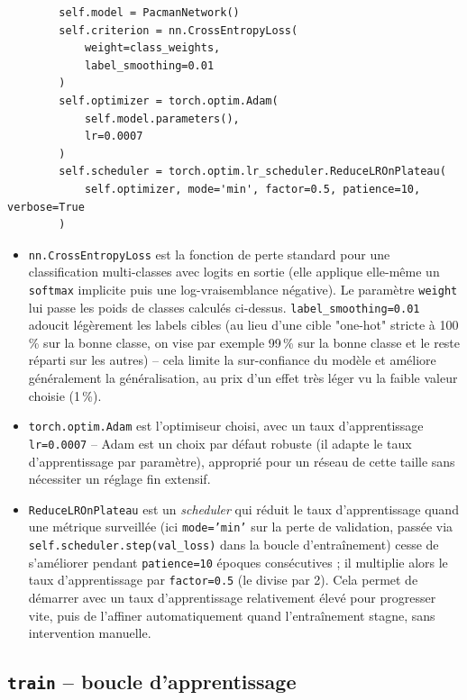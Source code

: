 \documentclass[a4paper,12pt]{article}
\begin{document}
\begin{lstlisting}
        self.model = PacmanNetwork()
        self.criterion = nn.CrossEntropyLoss(
            weight=class_weights,
            label_smoothing=0.01
        )
        self.optimizer = torch.optim.Adam(
            self.model.parameters(),
            lr=0.0007
        )
        self.scheduler = torch.optim.lr_scheduler.ReduceLROnPlateau(
            self.optimizer, mode='min', factor=0.5, patience=10, verbose=True
        )
\end{lstlisting}

\begin{itemize}
    \item \texttt{nn.CrossEntropyLoss} est la fonction de perte standard
    pour une classification multi-classes avec logits en sortie (elle
    applique elle-même un \texttt{softmax} implicite puis une
    log-vraisemblance négative). Le paramètre \texttt{weight} lui passe
    les poids de classes calculés ci-dessus.
    \texttt{label\_smoothing=0.01} adoucit légèrement les labels cibles
    (au lieu d'une cible "one-hot" stricte à 100\,\% sur la bonne classe,
    on vise par exemple 99\,\% sur la bonne classe et le reste réparti
    sur les autres) -- cela limite la sur-confiance du modèle et améliore
    généralement la généralisation, au prix d'un effet très léger vu la
    faible valeur choisie (1\,\%).
    \item \texttt{torch.optim.Adam} est l'optimiseur choisi, avec un
    taux d'apprentissage \texttt{lr=0.0007} -- Adam est un choix par
    défaut robuste (il adapte le taux d'apprentissage par paramètre),
    approprié pour un réseau de cette taille sans nécessiter un réglage
    fin extensif.
    \item \texttt{ReduceLROnPlateau} est un \emph{scheduler} qui réduit
    le taux d'apprentissage quand une métrique surveillée (ici
    \texttt{mode='min'} sur la perte de validation, passée via
    \texttt{self.scheduler.step(val\_loss)} dans la boucle
    d'entraînement) cesse de s'améliorer pendant \texttt{patience=10}
    époques consécutives ; il multiplie alors le taux d'apprentissage
    par \texttt{factor=0.5} (le divise par 2). Cela permet de démarrer
    avec un taux d'apprentissage relativement élevé pour progresser vite,
    puis de l'affiner automatiquement quand l'entraînement stagne, sans
    intervention manuelle.
\end{itemize}

\subsection{\texttt{train} -- boucle d'apprentissage}
\end{document}
